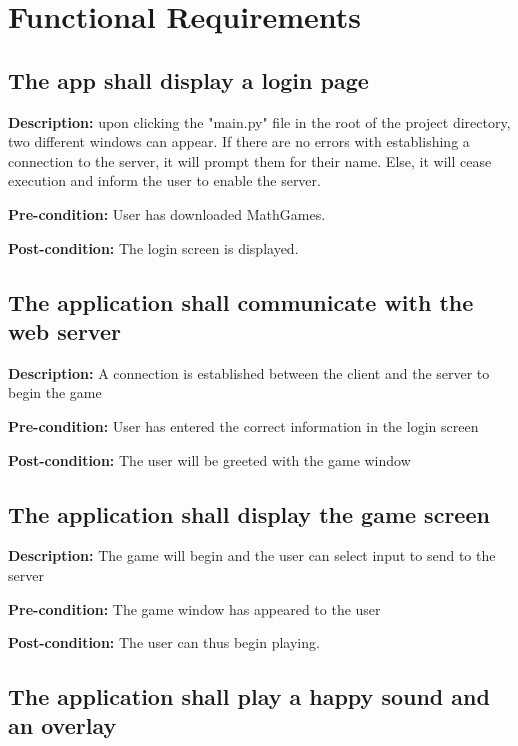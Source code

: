\documentclass[12pt]{article}
\begin{document}
\newpage

\section{Functional Requirements}

\begin{flushleft}

\subsection{The app shall display a login page}

\textbf{Description:} upon clicking the "main.py" file in the root of the project directory, two different windows can appear. If there are no errors with establishing a connection to the server, it will prompt them for their name. Else, it will cease execution and inform the user to enable the server.

\textbf{Pre-condition:} User has downloaded MathGames.

\textbf{Post-condition:} The login screen is displayed.


\subsection{The application shall communicate with the web server}

\textbf{Description:} A connection is established between the client and the server to begin the game

\textbf{Pre-condition:} User has entered the correct information in the login screen

\textbf{Post-condition:} The user will be greeted with the game window

\subsection{The application shall display the game screen}

\textbf{Description:} The game will begin and the user can select input to send to the server

\textbf{Pre-condition:} The game window has appeared to the user

\textbf{Post-condition:} The user can thus begin playing.

\subsection{The application shall play a happy sound and an overlay}


\end{flushleft}
\end{document}
